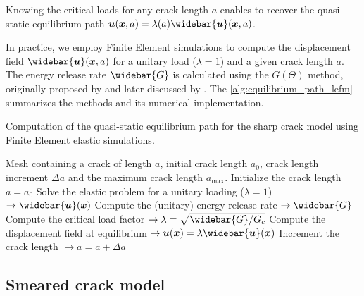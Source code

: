 \documentclass[OptSoft]{jtcam_preprint}
\newcommand{\xx}{\bm{x}}
\newcommand{\uu}{\bm{u}}
\newcommand{\uimp}{\uu_{\mathrm{imp}}}
\newcommand{\uimpbar}{\widebar{\uu}_{\mathrm{imp}}}
\begin{document}
Knowing the critical loads for any crack length $a$ enables to recover the quasi-static equilibrium path $\uu(\xx, a) = \lambda (a) \widebar{\uu}(\xx, a)$.

In practice, we employ Finite Element simulations to compute the displacement field $\widebar{\uu}(\xx, a)$ for a unitary load ($\lambda=1$) and a given crack length $a$.
The energy release rate $\widebar{G}$ is calculated using the $G(\Theta)$ method, originally proposed by \textcite{destuynder_sur_1981} and later discussed by \textcite{moran_crack_1987,suo_application_1992}.
The \cref{alg:equilibrium_path_lefm} summarizes the methods and its numerical implementation.

\begin{Algorithm}
\caption{Computation of the quasi-static equilibrium path for the sharp crack model using Finite Element elastic simulations.}
\label{alg:equilibrium_path_lefm}
\begin{algorithmic}[1]
  \Require Mesh containing a crack of length $a$, initial crack length $a_0$, crack length increment $\Delta a$ and the maximum crack length $a_{\mathrm{max}}$.
  \State Initialize the crack length $a = a_0$
    \State Solve the elastic problem for a unitary loading ($\lambda = 1$) $\to \widebar{\uu}(\xx)$
    \State Compute the (unitary) energy release rate $\to \widebar{G}$
    \State Compute the critical load factor $\to \lambda = \sqrt{\widebar{G} / G_c}$
    \State Compute the displacement field at equilibrium $\to \uu(\xx) = \lambda \widebar{\uu}(\xx)$
    \State Increment the crack length $\to a = a + \Delta a$
  \EndWhile
\end{algorithmic}
\end{Algorithm}

\subsection{Smeared crack model}
\end{document}

